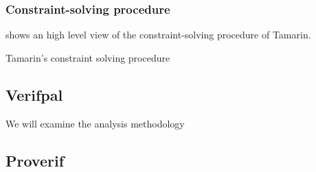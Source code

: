 \subsubsection{Constraint-solving procedure}
 shows an high level view of the constraint-solving procedure of Tamarin. 

\begin{algorithm}
    \begin{algorithmic}
        \EndFunction
    \end{algorithmic}
    \caption{Tamarin's constraint solving procedure}
    \label{pseudocode:tamarin-solving-procedure}
\end{algorithm}

\subsection{Verifpal}
We will examine the analysis methodology

\subsection{Proverif}